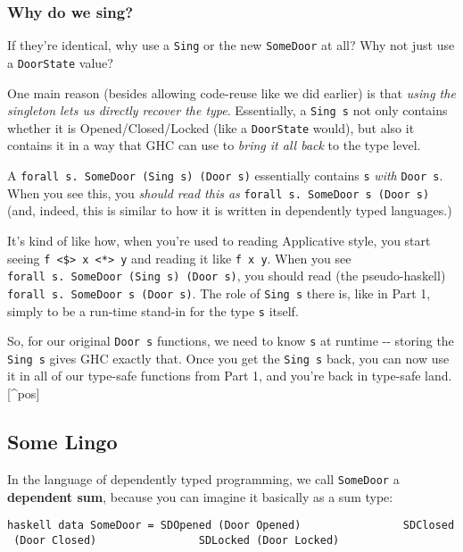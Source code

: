 \documentclass[]{article}
\begin{document}
\subsubsection{Why do we sing?}

If they're identical, why use a \texttt{Sing} or the new \texttt{SomeDoor} at
all? Why not just use a \texttt{DoorState} value?

One main reason (besides allowing code-reuse like we did earlier) is that
\emph{using the singleton lets us directly recover the type}. Essentially, a
\texttt{Sing\ s} not only contains whether it is Opened/Closed/Locked (like a
\texttt{DoorState} would), but also it contains it in a way that GHC can use to
\emph{bring it all back} to the type level.

A \texttt{forall\ s.\ SomeDoor\ (Sing\ s)\ (Door\ s)} essentially contains
\texttt{s} \emph{with} \texttt{Door\ s}. When you see this, you \emph{should
read this as} \texttt{forall\ s.\ SomeDoor\ s\ (Door\ s)} (and, indeed, this is
similar to how it is written in dependently typed languages.)

It's kind of like how, when you're used to reading Applicative style, you start
seeing \texttt{f\ \textless{}\$\textgreater{}\ x\ \textless{}*\textgreater{}\ y}
and reading it like \texttt{f\ x\ y}. When you see
\texttt{forall\ s.\ SomeDoor\ (Sing\ s)\ (Door\ s)}, you should read (the
pseudo-haskell) \texttt{forall\ s.\ SomeDoor\ s\ (Door\ s)}. The role of
\texttt{Sing\ s} there is, like in Part 1, simply to be a run-time stand-in for
the type \texttt{s} itself.

So, for our original \texttt{Door\ s} functions, we need to know \texttt{s} at
runtime -\/- storing the \texttt{Sing\ s} gives GHC exactly that. Once you get
the \texttt{Sing\ s} back, you can now use it in all of our type-safe functions
from Part 1, and you're back in type-safe land.{[}\^{}pos{]}

\subsection{Some Lingo}

In the language of dependently typed programming, we call \texttt{SomeDoor} a
\textbf{dependent sum}, because you can imagine it basically as a sum type:

\texttt{haskell\ data\ SomeDoor\ =\ SDOpened\ (Door\ \textquotesingle{}Opened)\ \ \ \ \ \ \ \ \ \ \ \ \ \ \ \textbar{}\ SDClosed\ (Door\ \textquotesingle{}Closed)\ \ \ \ \ \ \ \ \ \ \ \ \ \ \ \textbar{}\ SDLocked\ (Door\ \textquotesingle{}Locked)}
\end{document}
